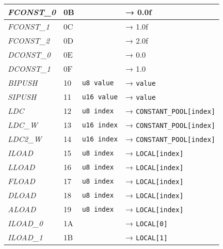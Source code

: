 \begin{center}
\begin{longtable}{ | p{} | p{} | p{} | p{} | }
        \emph{FCONST\_0}
		& 0B & & → 0.0f
		\\ \hline

        \emph{FCONST\_1}
		& 0C & & → 1.0f
		\\ \hline

        \emph{FCONST\_2}
		& 0D & & → 2.0f
		\\ \hline

        \emph{DCONST\_0}
		& 0E & & → 0.0
		\\ \hline

        \emph{DCONST\_1}
		& 0F & & → 1.0
		\\ \hline

        \emph{BIPUSH}
		& 10 & \lstinline|u8 value| & → \lstinline|value|
		\\ \hline

        \emph{SIPUSH}
		& 11 & \lstinline|u16 value| & → \lstinline|value|
		\\ \hline

        \emph{LDC}
		& 12 & \lstinline|u8 index| & → \lstinline|CONSTANT_POOL[index]|
		\\ \hline

        \emph{LDC\_W}
		& 13 & \lstinline|u16 index| & → \lstinline|CONSTANT_POOL[index]|
		\\ \hline

        \emph{LDC2\_W}
		& 14 & \lstinline|u16 index| & → \lstinline|CONSTANT_POOL[index]|
		\\ \hline

        \emph{ILOAD}
		& 15 & \lstinline|u8 index| & → \lstinline|LOCAL[index]|
		\\ \hline

        \emph{LLOAD}
		& 16 & \lstinline|u8 index| & → \lstinline|LOCAL[index]|
		\\ \hline

        \emph{FLOAD}
		& 17 & \lstinline|u8 index| & → \lstinline|LOCAL[index]|
		\\ \hline

        \emph{DLOAD}
		& 18 & \lstinline|u8 index| & → \lstinline|LOCAL[index]|
		\\ \hline

        \emph{ALOAD}
		& 19 & \lstinline|u8 index| & → \lstinline|LOCAL[index]|
		\\ \hline

        \emph{ILOAD\_0}
		& 1A & & → \lstinline|LOCAL[0]|
		\\ \hline

        \emph{ILOAD\_1}
		& 1B & & → \lstinline|LOCAL[1]|
		\\ \hline


\end{longtable}
\end{center}
